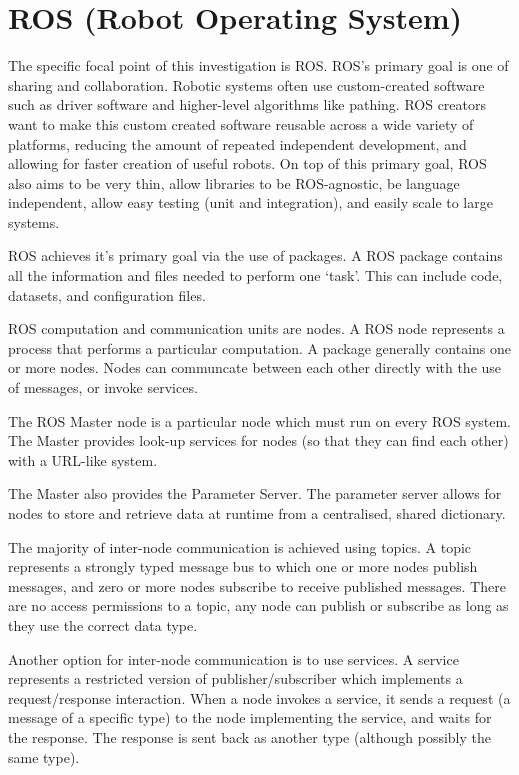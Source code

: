 \documentclass[../dissertation.tex]{subfiles}
\begin{document}
\section{ROS (Robot Operating System)}

The specific focal point of this investigation is ROS. ROS's primary goal is one of sharing and collaboration. Robotic systems often use custom-created software such as driver software and higher-level algorithms like pathing. ROS creators want to make this custom created software reusable across a wide variety of platforms, reducing the amount of repeated independent development, and allowing for faster creation of useful robots. On top of this primary goal, ROS also aims to be very thin, allow libraries to be ROS-agnostic, be language independent, allow easy testing (unit and integration), and easily scale to large systems.

ROS achieves it's primary goal via the use of packages. A ROS package contains all the information and files needed to perform one `task'. This can include code, datasets, and configuration files.

ROS computation and communication units are nodes. A ROS node represents a process that performs a particular computation. A package generally contains one or more nodes. Nodes can communcate between each other directly with the use of messages, or invoke services.

The ROS Master node is a particular node which must run on every ROS system. The Master provides look-up services for nodes (so that they can find each other) with a URL-like system.

The Master also provides the Parameter Server. The parameter server allows for nodes to store and retrieve data at runtime from a centralised, shared dictionary.

The majority of inter-node communication is achieved using topics. A topic represents a strongly typed message bus to which one or more nodes publish messages, and zero or more nodes subscribe to receive published messages. There are no access permissions to a topic, any node can publish or subscribe as long as they use the correct data type.

Another option for inter-node communication is to use services. A service represents a restricted version of publisher/subscriber which implements a request/response interaction. When a node invokes a service, it sends a request (a message of a specific type) to the node implementing the service, and waits for the response. The response is sent back as another type (although possibly the same type).
\end{document}

